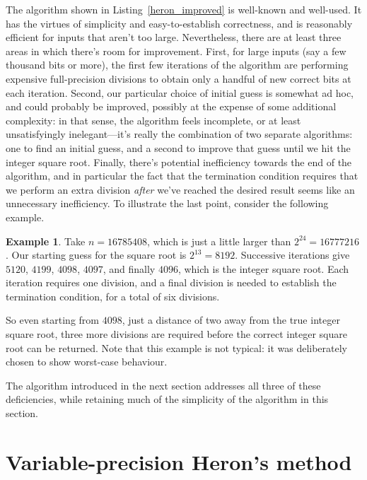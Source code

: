 \documentclass[a4paper]{article}
\theoremstyle{plain}
\theoremstyle{definition}
\newtheorem{example}[theorem]{Example}
\begin{document}
The algorithm shown in Listing~\ref{heron_improved} is well-known and
well-used. It has the virtues of simplicity and easy-to-establish correctness,
and is reasonably efficient for inputs that aren't too large. Nevertheless,
there are at least three areas in which there's room for improvement. First,
for large inputs (say a few thousand bits or more), the first few iterations of
the algorithm are performing expensive full-precision divisions to obtain only
a handful of new correct bits at each iteration. Second, our particular choice
of initial guess is somewhat ad hoc, and could probably be improved, possibly
at the expense of some additional complexity: in that sense, the algorithm
feels incomplete, or at least unsatisfyingly inelegant---it's really the
combination of two separate algorithms: one to find an initial guess, and a
second to improve that guess until we hit the integer square root. Finally,
there's potential inefficiency towards the end of the algorithm, and in
particular the fact that the termination condition requires that we perform an
extra division \emph{after} we've reached the desired result seems like an
unnecessary inefficiency. To illustrate the last point, consider the following
example.

\begin{example}
  Take $n = 16785408$, which is just a little larger than $2^{24} = 16777216$.
  Our starting guess for the square root is $2^{13} = 8192$. Successive
  iterations give $5120$, $4199$, $4098$, $4097$, and finally $4096$, which
  is the integer square root. Each iteration requires one division, and
  a final division is needed to establish the termination condition, for
  a total of six divisions.
\end{example}

So even starting from $4098$, just a distance of two away from the true integer
square root, three more divisions are required before the correct integer
square root can be returned. Note that this example is not typical: it was
deliberately chosen to show worst-case behaviour.

The algorithm introduced in the next section addresses all three of these
deficiencies, while retaining much of the simplicity of the algorithm in this
section.

\section{Variable-precision Heron's method}
\label{new_method}
\end{document}
